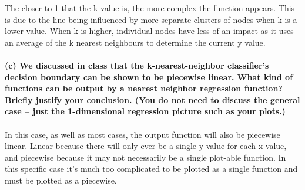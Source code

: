 \documentclass[]{report}   %
\begin{document}
The closer to 1 that the k value is, the more complex the function appears. This is due to the line being influenced by more separate clusters of nodes when k is a lower value. When k is higher, individual nodes have less of an impact as it uses an average of the k nearest neighbours to determine the current y value.
\\~\\
{\bf (c) We discussed in class that the k-nearest-neighbor classifier’s decision boundary can be shown to be piecewise linear. What kind of functions can be output by a nearest neighbor regression function? Briefly justify your conclusion. (You do not need to discuss the general case – just the 1-dimensional regression picture such as your plots.)}
\\~\\
In this case, as well as most cases, the output function will also be piecewise linear. Linear because there will only ever be a single y value for each x value, and piecewise because it may not necessarily be a single plot-able function. In this specific case it's much too complicated to be plotted as a single function and must be plotted as a piecewise.
\end{document}
